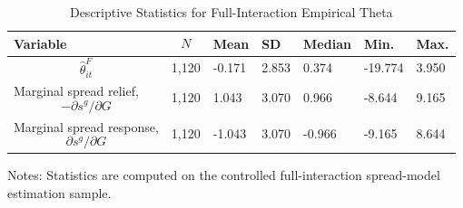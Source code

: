 \begin{table}[H]\centering
\begin{threeparttable}
\caption{Descriptive Statistics for Full-Interaction Empirical Theta}
\label{tab:theta_descriptive_stats}
\scriptsize
\begin{tabularx}{\textwidth}{lYYYYYY}
\toprule
Variable & $$N$$ & Mean & SD & Median & Min. & Max. \\
\midrule
$$\widehat{\theta}^{F}_{it}$$ & 1,120 & -0.171 & 2.853 & 0.374 & -19.774 & 3.950 \\
Marginal spread relief, $$-\partial s^g/\partial G$$ & 1,120 & 1.043 & 3.070 & 0.966 & -8.644 & 9.165 \\
Marginal spread response, $$\partial s^g/\partial G$$ & 1,120 & -1.043 & 3.070 & -0.966 & -9.165 & 8.644 \\
\bottomrule
\end{tabularx}
\begin{tablenotes}[flushleft]\footnotesize
\item Notes: Statistics are computed on the controlled full-interaction spread-model estimation sample.
\end{tablenotes}
\end{threeparttable}
\end{table}
